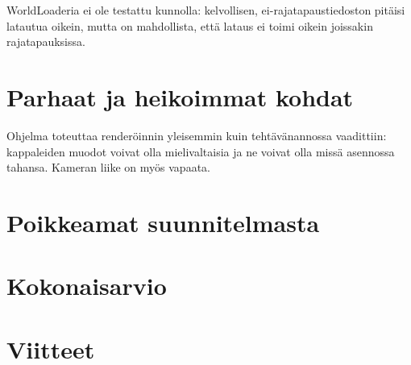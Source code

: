 \documentclass[12pt] {article}
\begin{document}
WorldLoaderia ei ole testattu kunnolla: kelvollisen, ei-rajatapaustiedoston pitäisi latautua oikein, mutta on mahdollista, että lataus ei toimi oikein joissakin rajatapauksissa.

\section {Parhaat ja heikoimmat kohdat}

Ohjelma toteuttaa renderöinnin yleisemmin kuin tehtävänannossa vaadittiin: kappaleiden muodot voivat olla mielivaltaisia ja ne voivat olla missä asennossa tahansa. Kameran liike on myös vapaata.

\section {Poikkeamat suunnitelmasta}

\section {Kokonaisarvio}

\section {Viitteet}
\end{document}
